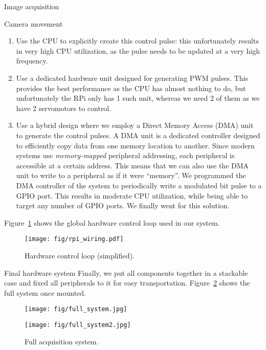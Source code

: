 \documentclass[10pt]{article}
\begin{document}
\begin{section}{Image acquisition}
\begin{subsubsection}{Camera movement}
        \begin{enumerate}
            \item Use the CPU to explicitly create this control pulse: this unfortunately results in very high CPU utilization, as the pulse needs to be updated at a very high frequency.
            \item Use a dedicated hardware unit designed for generating PWM pulses. This provides the best performance as the CPU has almost nothing to do, but unfortunately the RPi only has 1 such unit, whereas we need 2 of them as we have 2 servomotors to control.
            \item Use a hybrid design where we employ a Direct Memory Access (DMA) unit to generate the control pulses. A DMA unit is a dedicated controller designed to efficiently copy data from one memory location to another. Since modern systems use \emph{memory-mapped} peripheral addressing, each peripheral is accessible at a certain address. This means that we can also use the DMA unit to write to a peripheral as if it were ``memory''. We programmed the DMA controller of the system to periodically write a modulated bit pulse to a GPIO port. This results in moderate CPU utilization, while being able to target any number of GPIO ports. We finally went for this solution.
        \end{enumerate}

        Figure~\ref{fig:servomotor_control_loop} shows the global hardware control loop used in our system.

        \begin{figure}[!h]
            \begin{center}
                \texttt{[image: fig/rpi\_wiring.pdf]}
                \caption{Hardware control loop (simplified).}
                \label{fig:servomotor_control_loop}
            \end{center}
        \end{figure}
    \end{subsubsection}

    \begin{subsubsection}{Final hardware system}
        Finally, we put all components together in a stackable case and fixed all peripherals to it for easy transportation. Figure~\ref{fig:full_system} shows the full system once mounted.

        \medskip

        \begin{figure}[!h]
            \centering
            \begin{minipage}[b]{0.45\textwidth}
                \texttt{[image: fig/full\_system.jpg]}
            \end{minipage} \hspace{0.5em} %
            \begin{minipage}[b]{0.45\textwidth}
                \texttt{[image: fig/full\_system2.jpg]}
            \end{minipage}
            \caption{Full acquisition system.}
            \label{fig:full_system}
        \end{figure}


\end{subsubsection}
\end{section}
\end{document}
